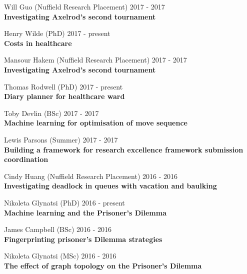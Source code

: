 \documentclass[10pt]{res} %
\begin{document}
\begin{resume}
\begin{etaremune}
\item
    Will Guo (Nuffield Research Placement) \hfill 2017 -
    2017\\
\textbf{Investigating Axelrod's second tournament}\\

\item
    Henry Wilde (PhD) \hfill 2017 -
    present\\
\textbf{Costs in healthcare}\\

\item
    Mansour Hakem (Nuffield Research Placement) \hfill 2017 -
    2017\\
\textbf{Investigating Axelrod's second tournament}\\

\item
    Thomas Rodwell (PhD) \hfill 2017 -
    present\\
\textbf{Diary planner for healthcare ward}\\

\item
    Toby Devlin (BSc) \hfill 2017 -
    2017\\
\textbf{Machine learning for optimisation of move sequence}\\

\item
    Lewis Parsons (Summer) \hfill 2017 -
    2017\\
\textbf{Building a framework for research excellence framework submission coordination}\\

\item
    Cindy Huang (Nuffield Research Placement) \hfill 2016 -
    2016\\
\textbf{Investigating deadlock in queues with vacation and baulking}\\

\item
    Nikoleta Glynatsi (PhD) \hfill 2016 -
    present\\
\textbf{Machine learning and the Prisoner's Dilemma}\\

\item
    James Campbell (BSc) \hfill 2016 -
    2016\\
\textbf{Fingerprinting prisoner's Dilemma strategies}\\

\item
    Nikoleta Glynatsi (MSc) \hfill 2016 -
    2016\\
\textbf{The effect of graph topology on the Prisoner's Dilemma}\\


\end{etaremune}
\end{resume}
\end{document}
